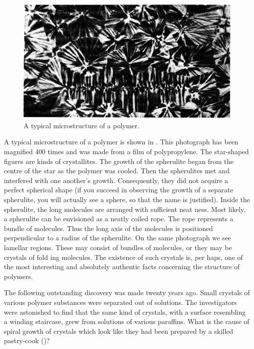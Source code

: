 \begin{figure}[!ht]
\centering
\includegraphics[width=\textwidth]{figures/fig-09-04.jpg}
\caption{A typical microstructure of a polymer.}
\label{fig-9.4}
\end{figure}

A typical microstructure of a polymer is shown in . This photograph has been magnified 400 times and was made from a film of polypropylene. The star-shaped figures are kinds of crystallites. The growth of the spherulite began from the centre of the star as the polymer was cooled. Then the spherulites met and interfered with one another’s growth. Consequently, they did not acquire a perfect spherical shape (if you succeed in observing the growth of a separate spherulite, you will actually see a sphere, so that the name is justified). Inside the spheru­lite, the long molecules are arranged with sufficient neat­ ness. Most likely, a spherulite can be envisioned as a neatly coiled rope. The rope represents a bundle of mol­ecules. Thus the long axis of the molecules is positioned perpendicular to a radius of the spherulite. On the same  photograph we see lamellar regions. These may consist of bundles of molecules, or they may be crystals of fold­ ing molecules. The existence of such crystals is, per­ haps, one of the most interesting and absolutely authen­tic facts concerning the structure of polymers.

The following outstanding discovery was made twenty years ago. Small crystals of various polymer substances were separated out of solutions. The investigators were astonished to find that the same kind of crystals, with a surface resembling a winding staircase, grew from solu­tions of various paraffins. What is the cause of spiral growth of crystals which look like they had been prepar­ed by a skilled pastry-cook ()?

